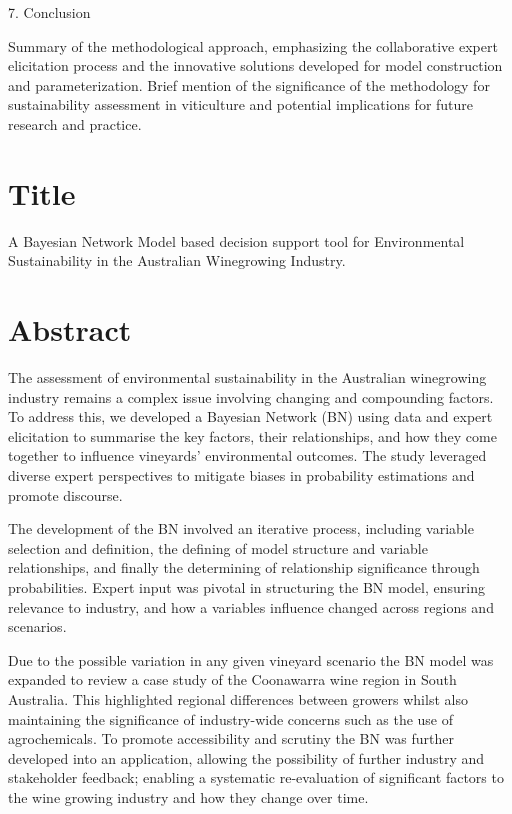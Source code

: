 7. Conclusion

    Summary of the methodological approach, emphasizing the collaborative expert elicitation process and the innovative solutions developed for model construction and parameterization.
    Brief mention of the significance of the methodology for sustainability assessment in viticulture and potential implications for future research and practice.




\section{Title}
A Bayesian Network Model based decision support tool for Environmental Sustainability in the Australian Winegrowing Industry.

\section{Abstract}

The assessment of environmental sustainability in the Australian winegrowing industry remains a complex issue involving changing and compounding factors. To address this, we developed a Bayesian Network (BN) using data and expert elicitation to summarise the key factors, their relationships, and how they come together to influence vineyards' environmental outcomes. The study leveraged diverse expert perspectives to mitigate biases in probability estimations and promote discourse.

The development of the BN involved an iterative process, including variable selection and definition, the defining of model structure and variable relationships, and finally the determining of relationship significance through probabilities. Expert input was pivotal in structuring the BN model, ensuring relevance to industry, and how a variables influence changed across regions and scenarios.

Due to the possible variation in any given vineyard scenario the BN model was expanded to review a case study of the Coonawarra wine region in South Australia. This highlighted regional differences between growers whilst also maintaining the significance of industry-wide concerns such as the use of agrochemicals. To promote accessibility and scrutiny the BN was further developed into an application, allowing the possibility of further industry and stakeholder feedback; enabling a systematic re-evaluation of significant factors to the wine growing industry and how they change over time.

